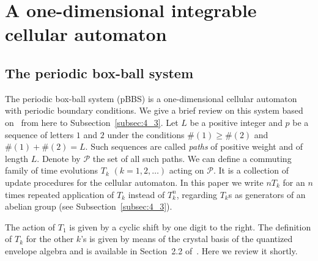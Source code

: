\documentclass[11pt]{article}
\begin{document}
\section{A one-dimensional integrable cellular automaton}\label{sec:4}
\subsection{The periodic box-ball system}\label{subsec:4_1}

The periodic box-ball system (pBBS) is a one-dimensional cellular automaton with periodic boundary conditions.
We give a brief review on this system based on~\cite{KTT} from here to Subsection~\ref{subsec:4_3}.
Let $L$ be a positive integer and $p$ be a sequence of letters $1$ and $2$ under the conditions
$\# (1) \geq \# (2)$ and $\# (1) + \# (2) = L$.
Such sequences are called {\em paths} of positive weight and of length $L$.
Denote by ${\mathcal P}$ the set of all such paths.
We can def\/ine a commuting family of time evolutions $T_k$ $(k=1,2,\ldots)$ acting on ${\mathcal P}$.
It is a collection of update procedures for the cellular automaton.
In this paper we write $n T_k$ for an $n$ times repeated application of $T_k$ instead of $T_k^n$,
regarding $T_k$s as generators of an abelian group (see Subsection~\ref{subsec:4_3}).

The action of $T_1$ is given by a cyclic shift by one digit to the right.
The def\/inition of $T_k$ for the other $k$'s is given by means of the crystal basis of
the quantized envelope algebra \cite{K}
and is available in Section~2.2 of~\cite{KTT}.
Here we review it shortly.
\end{document}
